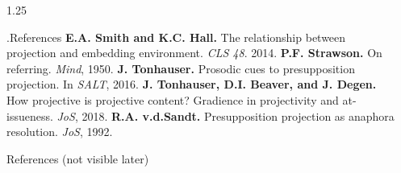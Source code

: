 \documentclass[final, table, cmyk]{beamer}
\newlength{\sepwidth}
\newlength{\colwidth}
\newcommand{\separatorcolumn}{\begin{column}{\sepwidth}\end{column}}
\begin{document}
\begin{frame}[t]
\begin{columns}[t]
\begin{column}{1.25\colwidth}
\begin{normalbox}{\phantom.\hfill References}
				\textbf{E.A. Smith and K.C. Hall.} The relationship between projection and embedding environment. \textit{CLS 48}. 2014.\quad\textbullet\quad
				\textbf{P.F. Strawson.} On referring. \textit{Mind}, 1950.\quad\textbullet\quad
				\textbf{J. Tonhauser.} Prosodic cues to presupposition projection. In \textit{SALT}, 2016.\quad\textbullet\quad
				\textbf{J. Tonhauser, D.I. Beaver, and J. Degen.} How projective is projective content? Gradience in projectivity and at-issueness. \textit{JoS}, 2018.\quad\textbullet\quad
				\textbf{R.A. v.d.Sandt.} Presupposition projection as anaphora resolution. \textit{JoS}, 1992.

			\end{normalbox}

			\vspace{20\baselineskip}
			\begin{normalbox}{References (not visible later)}
				
				
			\end{normalbox}

		\end{column}
		\separatorcolumn
	\end{columns}



\end{frame}
\end{document}
